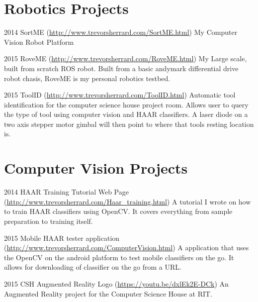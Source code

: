 \documentclass{tccv}
\begin{document}
\section{Robotics Projects}

\begin{yearlist}

\item{2014}
     {SortME (\href{http://www.trevorsherrard.com/SortME.html}{http://www.trevorsherrard.com\newline/SortME.html})}
     {My Computer Vision Robot Platform}
     
\item{2015}
     {RoveME (\href{http://www.trevorsherrard.com/RoveME.html}{http://www.trevorsherrard.com\newline/RoveME.html})}
     {My Large scale, built from scratch ROS robot. Built from a basic andymark differential drive robot chasis, RoveME is my personal robotics testbed.}
     
\item{2015}
	{ToolID (\href{http://www.trevorsherrard.com/ToolID.html}
	{http://www.trevorsherrard.com\newline/ToolID.html})}
	{Automatic tool identification for the computer science house project room. Allows user to query the type of tool using computer vision and HAAR classifiers. A laser diode on a two axis stepper motor gimbal will then point to where that tools resting location is.}
 

\end{yearlist}


\section{Computer Vision Projects}

\begin{yearlist}

\item{2014}
     {HAAR Training Tutorial Web Page (\href{http://www.trevorsherrard.com/Haar_training.html}{http://www.trevorsherrard.com\newline/Haar\_training.html})}
     {A tutorial I wrote on how to train HAAR classifiers using OpenCV. It covers everything from sample preparation to training itself.}
     
\item{2015}
     {Mobile HAAR tester application (\href{http://www.trevorsherrard.com/ComputerVision.html}{http://www.trevorsherrard.com\newline/ComputerVision.html})}
     {A application that uses the OpenCV on the android platform to test mobile classifiers on the go. It allows for downloading of classifier on the go from a URL.}
     
\item{2015}
     {CSH Augmented Reality Logo (\href{https://youtu.be/dxlEk2E-DCk}{https://youtu.be/dxlEk2E-DCk})}
     {An Augmented Reality project for the Computer Science House at RIT.}

\end{yearlist}
\end{document}
